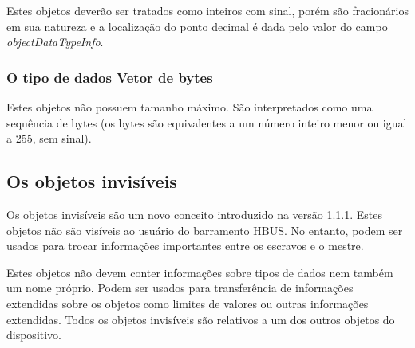 \documentclass[11pt]{report}
\begin{document}
Estes objetos deverão ser tratados como inteiros com sinal, porém são fracionários em sua natureza e a localização do ponto decimal é dada pelo valor do campo \textit{objectDataTypeInfo}.

\subsubsection*{O tipo de dados Vetor de bytes}

Estes objetos não possuem tamanho máximo. São interpretados como uma sequência de bytes (os bytes são equivalentes a um número inteiro menor ou igual a 255, sem sinal).

\begin{table}[H]
\centering
\caption{Formatação dos objetos do tipo vetor de bytes}
\end{table}

\subsection{Os objetos invisíveis}
\label{sec:hiddenobj}

Os objetos invisíveis são um novo conceito introduzido na versão 1.1.1. Estes objetos não são visíveis ao usuário do barramento HBUS. No entanto, podem ser usados para trocar informações importantes entre os escravos e o mestre.

Estes objetos não devem conter informações sobre tipos de dados nem também um nome próprio. Podem ser usados para transferência de informações extendidas sobre os objetos como limites de valores ou outras informações extendidas. Todos os objetos invisíveis são relativos a um dos outros objetos do dispositivo.
\end{document}

